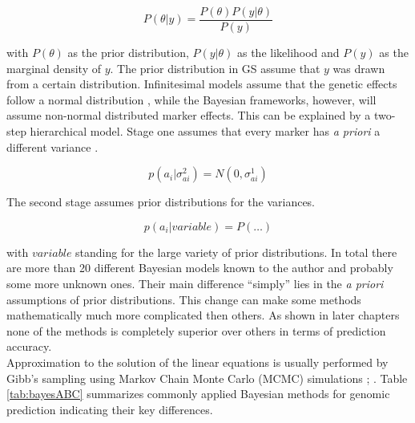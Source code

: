 \begin{equation}
P(\theta | y) = \frac{P(\theta )P(y | \theta)}{P(y)} 
\label{eqn:bayes}
\end{equation}

with $P(\theta )$ as the prior distribution, $P(y|\theta )$ as the likelihood and $P(y)$
as the marginal density of $y$. The prior distribution in GS assume that $y$ was drawn
from a certain distribution. Infinitesimal models assume that the genetic effects follow a
normal distribution \cite{legarra2018}, while the Bayesian frameworks, however, will
assume non-normal distributed marker effects. This can be explained by a two-step
hierarchical model. Stage one assumes that every marker has \textit{a priori} a
different variance \cite{legarra2018}.

\begin{equation}
p(a_i|\sigma_{ai}^2) = N (0,\sigma^1_{ai})
 \label{eqn:stageonbayes}
\end{equation}

The second stage assumes prior distributions for the variances.

\begin{equation}
p(a_i| variable ) = P(\dots )
 \label{eqn:stagetwobayes}
\end{equation}

with $variable$ standing for the large variety of prior distributions. In total there are
more than 20 different Bayesian models known to the author and probably some more unknown
ones. Their main difference ``simply'' lies in the \textit{a priori} assumptions of prior
distributions. This change can make some methods mathematically much more complicated then
others. As shown in later chapters none of the methods is completely superior over others
in terms of
prediction accuracy. \\
Approximation to the solution of the linear equations is usually performed by Gibb's
sampling using Markov Chain Monte Carlo (MCMC) simulations \cite{dlc2009}; \cite{BGLR}.
Table \ref{tab:bayesABC} summarizes commonly applied Bayesian methods for genomic
prediction indicating their key differences.

